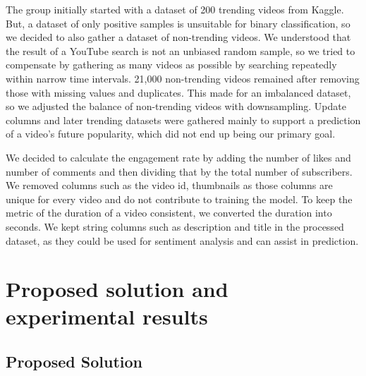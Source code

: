 \documentclass{article}
\begin{document}
\noindent
\quad The group initially started with a dataset of 200 trending videos from Kaggle. But, a dataset of only positive samples is unsuitable for binary classification, so we decided to also gather a dataset of non-trending videos. We understood that the result of a YouTube search is not an unbiased random sample, so we tried to compensate by gathering as many videos as possible by searching repeatedly within narrow time intervals. 21,000 non-trending videos remained after removing those with missing values and duplicates. This made for an imbalanced dataset, so we adjusted the balance of non-trending videos with downsampling. Update columns and later trending datasets were gathered mainly to support a prediction of a video’s future popularity, which did not end up being our primary goal.
\par We decided to calculate the engagement rate by adding the number of likes and number of comments and then dividing that by the total number of subscribers. We removed columns such as the video id, thumbnails as those columns are unique for every video and do not contribute to training the model. To keep the metric of the duration of a video consistent, we converted the duration into seconds. We kept string columns such as description and title in the processed dataset, as they could be used for sentiment analysis and can assist in prediction. 

\section*{Proposed solution and experimental results}
\subsection*{Proposed Solution}
\end{document}
